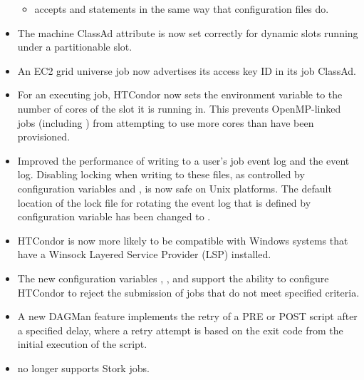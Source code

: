 \begin{itemize}
\begin{itemize}
  \item {} accepts  and 
statements in the same way that configuration files do.

  \end{itemize}

\item The machine ClassAd attribute  is now set correctly
for dynamic slots running under a partitionable slot.

\item An EC2 grid universe job now advertises its access key ID in 
its job ClassAd.

\item For an executing job, HTCondor now sets the environment variable 
 to the number of cores of the slot it is running in.
This prevents OpenMP-linked jobs (including ) 
from attempting to use more cores than have been provisioned.

\item Improved the performance of writing to a user's job event log 
and the event log.
Disabling locking when writing to these files,
as controlled by configuration variables 
and , is now safe on Unix platforms.
The default location of the lock file for rotating the event log
that is defined by configuration variable
 has been changed to
.

\item HTCondor is now more likely to be compatible with Windows systems
that have a Winsock Layered Service Provider (LSP) installed.

\item The new configuration variables ,
, 
and 
support the ability to configure HTCondor to reject the submission
of jobs that do not meet specified criteria.

\item A new DAGMan feature implements the retry of a PRE or POST script 
after a specified delay, 
where a retry attempt is
based on the exit code from the initial execution of the script.

\item {} no longer supports Stork jobs.


\end{itemize}
